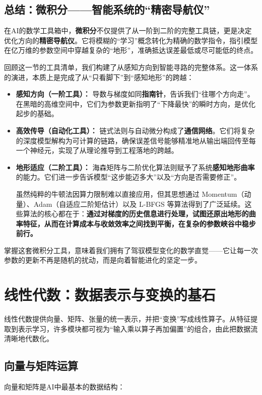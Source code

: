 \subsection{总结：微积分——智能系统的“精密导航仪”}

在AI的数学工具箱中，\textbf{微积分}不仅提供了从一阶到二阶的完整工具链，更是决定优化方向的\textbf{精密导航仪}。它将模糊的“学习”概念转化为精确的数学指令，指引模型在亿万维的参数空间中穿越复杂的“地形”，准确抵达误差最低或尽可能低的终点。

回顾这一节的工具清单，我们构建了从感知方向到智能寻路的完整体系。这一体系的演进，本质上是完成了从“只看脚下”到“感知地形”的跨越：
\begin{itemize}
    \item \textbf{感知方向（一阶工具）：} 导数与梯度如同\textbf{指南针}，告诉我们“往哪个方向走”。在黑暗的高维空间中，它们为参数更新指明了“下降最快”的瞬时方向，是优化起步的基础。
    
    \item \textbf{高效传导（自动化工具）：} 链式法则与自动微分构成了\textbf{通信网络}。它们将复杂的深度模型解构为可计算的链路，确保误差信号能够精准地从输出端回传至每一个神经元，实现了从理论推导到工程落地的跨越。
    
    \item \textbf{地形适应（二阶工具）：} 海森矩阵与二阶优化算法则赋予了系统\textbf{感知地形曲率}的能力。它们进一步告诉模型“这步能迈多大”以及“方向是否需要修正”。
    
    虽然纯粹的牛顿法因算力限制难以直接应用，但其思想通过 Momentum（动量）、Adam（自适应二阶矩估计）以及 L-BFGS 等算法得到了广泛延续。这些算法的核心都在于：\textbf{通过对梯度的历史信息进行处理，试图还原出地形的曲率特征，从而在计算成本与收敛效率之间找到平衡，在复杂的参数峡谷中稳步前行。}
\end{itemize}

掌握这套微积分工具，意味着我们拥有了驾驭模型变化的数学直觉——它让每一次参数的更新不再是随机的扰动，而是向着智能进化的坚定一步。

\section{线性代数：数据表示与变换的基石}

线性代数提供向量、矩阵、张量的统一表示，并把“变换”写成线性算子。从特征提取到表示学习，许多模块都可视为“输入乘以算子再加偏置”的组合，由此把数据流清晰地代数化。

\subsection{向量与矩阵运算}
向量和矩阵是AI中最基本的数据结构：

